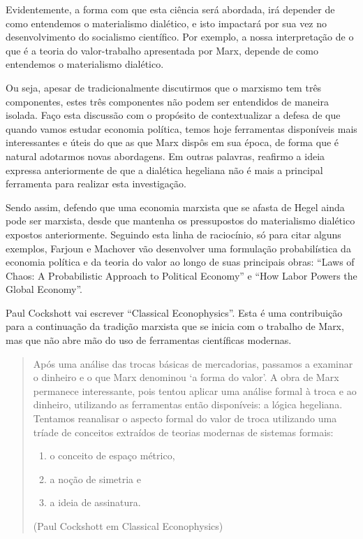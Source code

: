 Evidentemente, a forma com que esta ciência será abordada, irá depender de como entendemos o materialismo dialético, e isto impactará por sua vez no desenvolvimento do socialismo científico. Por exemplo, a nossa interpretação de o que é a teoria do valor-trabalho apresentada por Marx, depende de como entendemos o materialismo dialético.

Ou seja, apesar de tradicionalmente discutirmos que o marxismo tem três componentes, estes três componentes não podem ser entendidos de maneira isolada. Faço esta discussão com o propósito de contextualizar a defesa de que quando vamos estudar economia política, temos hoje ferramentas disponíveis mais interessantes e úteis do que as que Marx dispôs em sua época, de forma que é natural adotarmos novas abordagens. Em outras palavras, reafirmo a ideia expressa anteriormente de que a dialética hegeliana não é mais a principal ferramenta para realizar esta investigação.

Sendo assim, defendo que uma economia marxista que se afasta de Hegel ainda pode ser marxista, desde que mantenha os pressupostos do materialismo dialético expostos anteriormente. Seguindo esta linha de raciocínio, só para citar alguns exemplos, Farjoun e Machover vão desenvolver uma formulação probabilística da economia política e da teoria do valor ao longo de suas principais obras: “Laws of Chaos: A Probabilistic Approach to Political Economy” e “How Labor Powers the Global Economy”.

Paul Cockshott vai escrever “Classical Econophysics”. Esta é uma contribuição para a continuação da tradição marxista que se inicia com o trabalho de Marx, mas que não abre mão do uso de ferramentas científicas modernas.

\begin{quote}
Após uma análise das trocas básicas de mercadorias, passamos a examinar o dinheiro e o que Marx denominou ‘a forma do valor’. A obra de Marx permanece interessante, pois tentou aplicar uma análise formal à troca e ao dinheiro, utilizando as ferramentas então disponíveis: a lógica hegeliana. Tentamos reanalisar o aspecto formal do valor de troca utilizando uma tríade de conceitos extraídos de teorias modernas de sistemas formais:
\begin{enumerate}
\item o conceito de espaço métrico,

\item a noção de simetria e

\item a ideia de assinatura.
\end{enumerate}
(Paul Cockshott em Classical Econophysics)
\end{quote}


